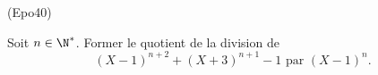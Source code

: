 \begin{tiny}(Epo40)\end{tiny} Soit $n \in \N^*$. Former le quotient de la division de 
\[
  (X-1)^{n+2} + (X+3)^{n+1} -1 \text{ par } (X-1)^n.
\]
